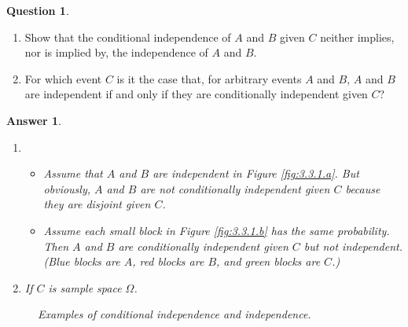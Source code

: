 \documentclass[utf8]{article}
\theoremstyle{definition}%
\newtheorem{question}{Question} %
\theoremstyle{plain}%
\newtheorem{answer}{Answer} %
\begin{document}
\begin{question} ~
    \begin{enumerate}[label=(\alph*)]
        \item Show that the conditional independence of $A$ and $B$ given $C$ neither implies, nor is implied by, the independence of $A$ and $B$.
        \item For which event $C$ is it the case that, for arbitrary events $A$ and $B$, $A$ and $B$ are independent if and only if they are conditionally independent given $C$?
    \end{enumerate}
\end{question}
\begin{answer} ~
    \begin{enumerate}[label=(\alph*)]
        \item 
            \begin{itemize}
                \item Assume that $A$ and $B$ are independent in Figure \ref{fig:3.3.1.a}. But obviously, $A$ and $B$ are not conditionally independent given $C$ because they are disjoint given $C$.
                \item Assume each small block in Figure \ref{fig:3.3.1.b} has the same probability. Then $A$ and $B$ are conditionally independent given $C$ but not independent. (Blue blocks are $A$, red blocks are $B$, and green blocks are $C$.)
            \end{itemize}
        \item If $C$ is sample space $\Omega$.
    \end{enumerate}
    \begin{figure}[H]
        \centering
        \quad
        \caption{Examples of conditional independence and independence.}
        \label{fig:3.3.1}
    \end{figure}
\end{answer}
\end{document}
